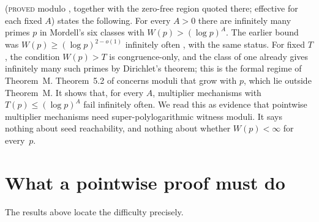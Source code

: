 \documentclass[11pt,reqno]{amsart}
\theoremstyle{definition}
\newcommand{\status}[1]{\textsc{#1}}
\begin{document}
\cite[Theorem~5.2]{PO3} (\status{proved} modulo \cite[Cor.~1.4]{TZ},
together with the zero-free region quoted there; effective for each fixed
$A$) states the following.  For every $A>0$ there are infinitely many
primes $p$ in Mordell's six classes with $W(p)>(\log p)^A$.  The earlier
bound was $W(p)\ge(\log p)^{2-o(1)}$ infinitely often \cite[Thm.~5.1]{PO},
with the same status.
For fixed $T$, the condition $W(p)>T$ is congruence-only, and the class of
one already gives infinitely many such primes by Dirichlet's theorem; this
is the formal regime of Theorem~M.  Theorem~5.2 of \cite{PO3} concerns
moduli that grow with $p$, which lie outside Theorem~M.  It shows that,
for every $A$, multiplier mechanisms with $T(p)\le(\log p)^A$ fail
infinitely often.  We read this as evidence that pointwise multiplier
mechanisms need super-polylogarithmic witness moduli.  It says nothing
about seed reachability, and nothing about whether $W(p)<\infty$ for
every~$p$.

\section{What a pointwise proof must do}\label{sec:discussion}

The results above locate the difficulty precisely.
\end{document}

